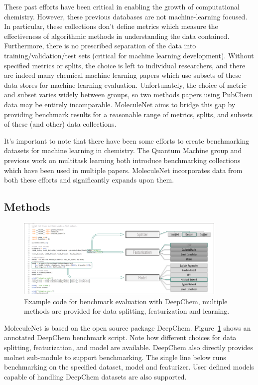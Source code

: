These past efforts have been critical in enabling the growth of computational chemistry. However, these previous databases are not machine-learning focused. In particular, these collections don't define metrics which measure the effectiveness of algorithmic methods in understanding the data contained. Furthermore, there is no prescribed separation of the data into training/validation/test sets (critical for machine learning development). Without specified metrics or splits, the choice is left to individual researchers, and there are indeed many chemical machine learning papers which use subsets of these data stores for machine learning evaluation. Unfortunately, the choice of metric and subset varies widely between groups, so two methods papers using PubChem data may be entirely incomparable. MoleculeNet aims to bridge this gap by providing benchmark results for a reasonable range of metrics, splits, and subsets of these (and other) data collections.

It's important to note that there have been some efforts to create benchmarking datasets for machine learning in chemistry. The Quantum Machine group \cite{QuantumMachine} and previous work on multitask learning \cite{ramsundar2015massively} both introduce benchmarking collections which have been used in multiple papers. MoleculeNet incorporates data from both these efforts and significantly expands upon them.

\subsection{Methods}

\begin{figure}
  \centering
  \includegraphics[width=0.9\textwidth]{Images/benchmark_framework.png}
  \caption{Example code for benchmark evaluation with DeepChem, multiple methods are provided for data splitting, featurization and learning.}
  \label{fig:benchmark_example}
\end{figure}

MoleculeNet is based on the open source package DeepChem\cite{deepchem}. Figure~\ref{fig:benchmark_example} shows an annotated DeepChem benchmark script. Note how different choices for data splitting, featurization, and model are available. DeepChem also directly provides molnet sub-module to support benchmarking. The single line below runs benchmarking on the specified dataset, model and featurizer. User defined models capable of handling DeepChem datasets are also supported.

